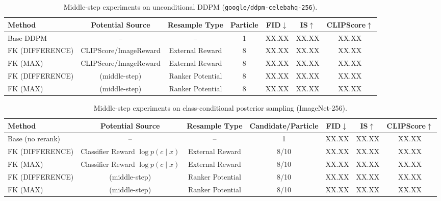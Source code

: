 \documentclass{article}
\newcommand{\method}{\text{Diffusion Ranker}\xspace}
\begin{document}
\begin{table}[htbp]
\centering
\caption{Middle-step experiments on unconditional DDPM (\texttt{google/ddpm-celebahq-256}).}
\label{tab:midstep_uncond_template}
\begin{tabular}{lcccccc}
\toprule
Method & Potential Source & Resample Type & Particle & FID$\downarrow$ & IS$\uparrow$ & CLIPScore$\uparrow$ \\
\midrule
Base DDPM & -- & -- & 1 & XX.XX & XX.XX & XX.XX \\
FK (DIFFERENCE) & CLIPScore/ImageReward & External Reward & 8 & XX.XX & XX.XX & XX.XX \\
FK (MAX) & CLIPScore/ImageReward & External Reward & 8 & XX.XX & XX.XX & XX.XX \\
FK (DIFFERENCE) & \method (middle-step) & Ranker Potential & 8 & XX.XX & XX.XX & XX.XX \\
FK (MAX) & \method (middle-step) & Ranker Potential & 8 & XX.XX & XX.XX & XX.XX \\
\bottomrule
\end{tabular}
\end{table}

\begin{table}[htbp]
\centering
\caption{Middle-step experiments on class-conditional posterior sampling (ImageNet-256).}
\label{tab:midstep_class_template}
\begin{tabular}{lcccccc}
\toprule
Method & Potential Source & Resample Type & Candidate/Particle & FID$\downarrow$ & IS$\uparrow$ & CLIPScore$\uparrow$ \\
\midrule
Base (no rerank) & -- & -- & 1 & XX.XX & XX.XX & XX.XX \\
FK (DIFFERENCE) & Classifier Reward $\log p(c\mid x)$ & External Reward & 8/10 & XX.XX & XX.XX & XX.XX \\
FK (MAX) & Classifier Reward $\log p(c\mid x)$ & External Reward & 8/10 & XX.XX & XX.XX & XX.XX \\
FK (DIFFERENCE) & \method (middle-step) & Ranker Potential & 8/10 & XX.XX & XX.XX & XX.XX \\
FK (MAX) & \method (middle-step) & Ranker Potential & 8/10 & XX.XX & XX.XX & XX.XX \\
\bottomrule
\end{tabular}
\end{table}
\end{document}
